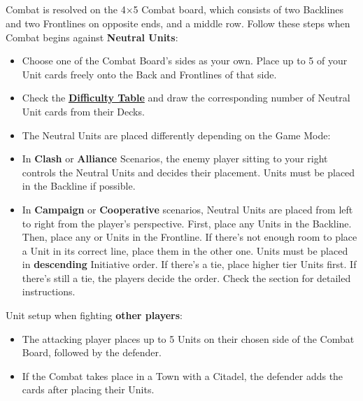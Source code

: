 \begin{multicols*}{2}
\subsection*{}

Combat is resolved on the 4×5 Combat board, which consists of two Backlines and two Frontlines on opposite ends, and a middle row.
Follow these steps when Combat begins against \textbf{Neutral Units}:

\begin{itemize}
  \item Choose one of the Combat Board's sides as your own. Place up to 5 of your Unit cards freely onto the Back and Frontlines of that side.
  \item Check the \hyperlink{Difficulty Table}{\textbf{Difficulty Table}} \iftoggle{printable}{(on the back cover)}{} and draw the corresponding number of Neutral Unit cards from their Decks.
  \item The Neutral Units are placed differently depending on the Game Mode:
  \item In \textbf{Clash} or \textbf{Alliance} Scenarios, the enemy player sitting to your right controls the Neutral Units and decides their placement.  Units must be placed in the Backline if possible.
  \item {}In \textbf{Campaign} or \textbf{Cooperative} scenarios, Neutral Units are placed from left to right from the player's perspective.
First, place any  Units in the Backline.
Then, place any  or  Units in the Frontline.
If there's not enough room to place a Unit in its correct line, place them in the other one.
Units must be placed in \textbf{descending} Initiative order.
If there's a tie, place higher tier Units first.
If there's still a tie, the players decide the order.
Check the  section for detailed instructions.
\end{itemize}

\pagebreak
Unit setup when fighting \textbf{other players}:
\begin{itemize}
  \item The attacking player places up to 5 Units on their chosen side of the Combat Board, followed by the defender.
  \item If the Combat takes place in a Town with a Citadel, the defender adds the  cards after placing their Units.
\end{itemize}


\end{multicols*}
